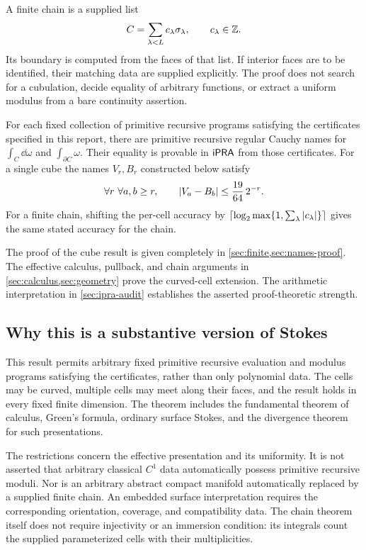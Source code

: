 A finite chain is a supplied list
\[
 C=\sum_{\lambda<L}c_\lambda\sigma_\lambda,\qquad c_\lambda\in\mathbb Z.
\]
Its boundary is computed from the faces of that list. If interior faces are
to be identified, their matching data are supplied explicitly. The proof
does not search for a cubulation, decide equality of arbitrary functions,
or extract a uniform modulus from a bare continuity assertion.

\begin{theorem}\label{thm:informal}
For each fixed collection of primitive recursive programs satisfying the
certificates specified in this report, there are primitive recursive regular
Cauchy names for $\int_C\dd\omega$ and $\int_{\partial C}\omega$.
Their equality is provable in $\mathsf{iPRA}$ from those certificates.
For a single cube the names $V_r,B_r$ constructed below satisfy
\begin{equation}\label{eq:headline}
 \forall r\ \forall a,b\ge r,\qquad
 \left|V_a-B_b\right|\le \frac{19}{64}\,2^{-r}.
\end{equation}
For a finite chain, shifting the per-cell accuracy by
$\left\lceil\log_2\max\{1,\sum_\lambda|c_\lambda|\}\right\rceil$ gives the same stated accuracy for the chain.
\end{theorem}

The proof of the cube result is given completely in \cref{sec:finite,sec:names-proof}.
The effective calculus, pullback, and chain arguments in
\cref{sec:calculus,sec:geometry} prove the curved-cell extension.
The arithmetic interpretation in \cref{sec:ipra-audit} establishes the asserted
proof-theoretic strength.

\subsection{Why this is a substantive version of Stokes}

This result permits arbitrary fixed primitive recursive evaluation and modulus
programs satisfying the certificates, rather than only polynomial data.
The cells may be curved, multiple cells may meet along their faces, and the
result holds in every fixed finite dimension. The theorem includes the
fundamental theorem of calculus, Green's formula, ordinary surface Stokes,
and the divergence theorem for such presentations.

The restrictions concern the effective presentation and its uniformity.
It is not asserted that arbitrary classical $C^1$ data automatically possess
primitive recursive moduli. Nor is an arbitrary abstract compact manifold
automatically replaced by a supplied finite chain. An embedded surface
interpretation requires the corresponding orientation, coverage, and
compatibility data. The chain theorem itself does not require injectivity
or an immersion condition: its integrals count the supplied parameterized
cells with their multiplicities.


